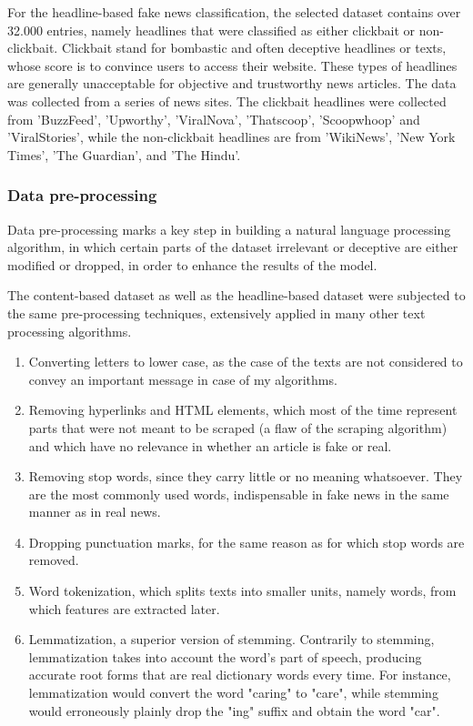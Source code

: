 For the headline-based fake news classification, the selected dataset \cite{dataset_headline} contains over 32.000 entries, namely headlines that were classified as either clickbait or non-clickbait. Clickbait stand for bombastic and often deceptive headlines or texts, whose score is to convince users to access their website. These types of headlines are generally unacceptable for objective and trustworthy news articles. The data was collected from a series of news sites. The clickbait headlines were collected from 'BuzzFeed', 'Upworthy', 'ViralNova', 'Thatscoop', 'Scoopwhoop' and 'ViralStories', while the non-clickbait headlines are from 'WikiNews', 'New York Times', 'The Guardian', and 'The Hindu'.

\subsubsection{Data pre-processing}
Data pre-processing marks a key step in building a natural language processing algorithm, in which certain parts of the dataset irrelevant or deceptive are either modified or dropped, in order to enhance the results of the model.

The content-based dataset as well as the headline-based dataset were subjected to the same pre-processing techniques, extensively applied in many other text processing algorithms.
\begin{enumerate}
  \item Converting letters to lower case, as the case of the texts are not considered to convey an important message in case of my algorithms.
  \item Removing hyperlinks and HTML elements, which most of the time represent parts that were not meant to be scraped (a flaw of the scraping algorithm) and which have no relevance in whether an article is fake or real.
  \item Removing stop words, since they carry little or no meaning whatsoever. They are the most commonly used words, indispensable in fake news in the same manner as in real news.
  \item Dropping punctuation marks, for the same reason as for which stop words are removed.
  \item Word tokenization, which splits texts into smaller units, namely words, from which features are extracted later.
  \item Lemmatization, a superior version of stemming. Contrarily to stemming, lemmatization takes into account the word's part of speech, producing accurate root forms that are real dictionary words every time. For instance, lemmatization would convert the word "caring" to "care", while stemming would erroneously plainly drop the "ing" suffix and obtain the word "car".
\end{enumerate}
